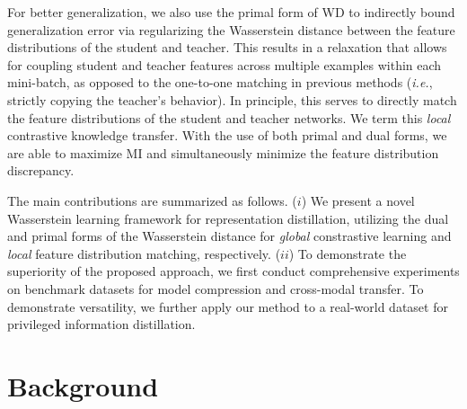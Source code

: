 \documentclass[final]{cvpr}
\theoremstyle{definition}
\begin{document}
For better generalization, we also use the primal form of WD to indirectly bound generalization error via regularizing the Wasserstein distance between the feature distributions of the student and teacher. 
This results in a relaxation that allows for coupling student and teacher features across multiple examples within each mini-batch, as opposed to the one-to-one matching in previous methods (\emph{i.e.}, strictly copying the teacher's behavior). In principle, this serves to directly match the feature distributions of the student and teacher networks. We term this \emph{local} contrastive knowledge transfer.
With the use of both primal and dual forms, we are able to maximize MI and simultaneously minimize the feature distribution discrepancy.

The main contributions are summarized as follows. ($i$) We present a novel Wasserstein learning framework for representation distillation, utilizing the dual and primal forms of the Wasserstein distance for \emph{global} constrastive learning and \emph{local} feature distribution matching, respectively. 
($ii$) To demonstrate the superiority of the proposed approach, we first conduct comprehensive experiments on benchmark datasets for model compression and cross-modal transfer. To demonstrate versatility, we further apply our method to a real-world dataset for privileged information distillation.

\section{Background}
\end{document}
